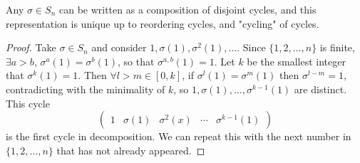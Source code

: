 \documentclass[10pt]{article}
\begin{document}
    \begin{theorem}\label{thm:disjoint cycle decomp}
        Any $ \sigma\in S_n $ can be written as a composition of disjoint cycles, and this representation is unique up to reordering cycles, and "cycling" of cycles.
    \end{theorem}
    \begin{proof}
        Take $ \sigma\in S_n $ and consider $ 1,\sigma(1),\sigma^2(1),\dots $. Since $ \{1,2,\dots,n\} $ is finite, $ \exists a>b $, $ \sigma^a(1)=\sigma^b(1) $, so that $ \sigma^{a,b}(1)=1 $. Let $k$ be the smallest integer that $ \sigma^{k}(1)=1 $. Then $ \forall l>m\in [0,k] $, if $ \sigma^{l}(1)=\sigma^{m}(1) $ then $ \sigma^{l-m}=1 $, contradicting with the minimality of $k$, so $ 1,\sigma(1),\dots,\sigma^{k-1}(1) $ are distinct. This cycle 
        \[
            \begin{pmatrix}
                1&\sigma(1)&\sigma^2(x)&\cdots&\sigma^{k-1}(1)
            \end{pmatrix}
        \]
        is the first cycle in decomposition. We can repeat this with the next number in $\{1,2,\dots,n\}$ that has not already appeared.


\end{proof}
\end{document}

